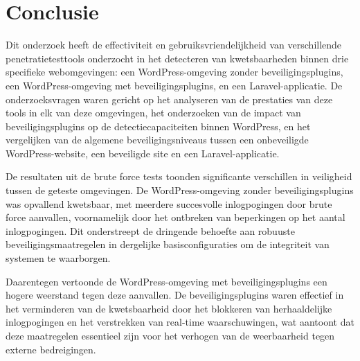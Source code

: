 
\chapter{Conclusie}%
\label{ch:conclusie}


Dit onderzoek heeft de effectiviteit en gebruiksvriendelijkheid van verschillende penetratietesttools onderzocht in het 
detecteren van kwetsbaarheden binnen drie specifieke webomgevingen: een WordPress-omgeving zonder beveiligingsplugins, 
een WordPress-omgeving met beveiligingsplugins, en een Laravel-applicatie. De onderzoeksvragen waren gericht op het 
analyseren van de prestaties van deze tools in elk van deze omgevingen, het onderzoeken van de impact van beveiligingsplugins 
op de detectiecapaciteiten binnen WordPress, en het vergelijken van de algemene beveiligingsniveaus tussen een onbeveiligde 
WordPress-website, een beveiligde site en een Laravel-applicatie.

De resultaten uit de brute force tests toonden significante verschillen in veiligheid tussen de geteste omgevingen. 
De WordPress-omgeving zonder beveiligingsplugins was opvallend kwetsbaar, met meerdere succesvolle inlogpogingen door 
brute force aanvallen, voornamelijk door het ontbreken van beperkingen op het aantal inlogpogingen. Dit onderstreept 
de dringende behoefte aan robuuste beveiligingsmaatregelen in dergelijke basisconfiguraties om de integriteit van 
systemen te waarborgen.

Daarentegen vertoonde de WordPress-omgeving met beveiligingsplugins een hogere weerstand tegen deze 
aanvallen. De beveiligingsplugins waren effectief in het verminderen van de kwetsbaarheid door het blokkeren van 
herhaaldelijke inlogpogingen en het verstrekken van real-time waarschuwingen, wat aantoont dat deze maatregelen 
essentieel zijn voor het verhogen van de weerbaarheid tegen externe bedreigingen.

